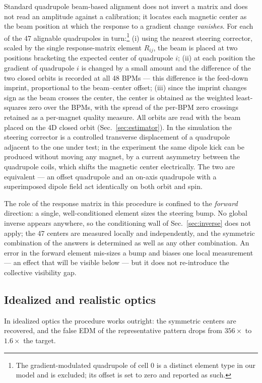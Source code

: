\documentclass[aps,prab,reprint,superscriptaddress,nofootinbib]{revtex4-2}
\begin{document}
Standard quadrupole beam-based alignment does not invert a matrix and does
not read an amplitude against a calibration; it locates each magnetic center
as the beam position at which the response to a gradient change
\emph{vanishes}.  For each of the 47 alignable quadrupoles in
turn:\footnote{The gradient-modulated quadrupole of cell 0 is a distinct
element type in our model and is excluded; its offset is set to zero and
reported as such.}
(i) using the nearest steering corrector, scaled by the single
response-matrix element $R_{ij}$, the beam is placed at two positions
bracketing the expected center of quadrupole $i$; (ii) at each position the
gradient of quadrupole $i$ is changed by a small amount and the difference of
the two closed orbits is recorded at all 48 BPMs --- this difference is the
feed-down imprint, proportional to the beam--center offset; (iii) since the
imprint changes sign as the beam crosses the center, the center is obtained
as the weighted least-squares zero over the BPMs, with the spread of the
per-BPM zero crossings retained as a per-magnet quality measure.  All orbits
are read with the beam placed on the 4D closed orbit
(Sec.~\ref{sec:estimator}).  In the simulation the steering corrector is a
controlled transverse displacement of a quadrupole adjacent to the one under
test; in the experiment the same dipole kick can be produced without moving
any magnet, by a current asymmetry between the quadrupole coils, which shifts
the magnetic center electrically.  The two are equivalent --- an offset
quadrupole and an on-axis quadrupole with a superimposed dipole field act
identically on both orbit and spin.

The role of the response matrix in this procedure is confined to the
\emph{forward} direction: a single, well-conditioned element sizes the
steering bump.  No global inverse appears anywhere, so the conditioning wall
of Sec.~\ref{sec:inverse} does not apply; the 47 centers are measured
locally and independently, and the symmetric combination of the answers is
determined as well as any other combination.  An error in the forward element
mis-sizes a bump and biases one local measurement --- an effect that will be
visible below --- but it does not re-introduce the collective visibility gap.

\subsection{Idealized and realistic optics}
\label{sec:bbareal}

In idealized optics the procedure works outright: the symmetric centers are
recovered, and the false EDM of the representative pattern drops from
$356\times$ to $1.6\times$ the target.
\end{document}
